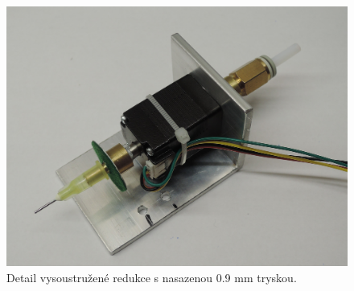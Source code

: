 \begin{figure}[h!]
  \centering
    \includegraphics[width=0.8\linewidth]{obrazky/tryska2.jpg}%
    \caption{Detail vysoustružené redukce s nasazenou 0.9 mm tryskou.}
    \label{fig:tryska}
\end{figure}


